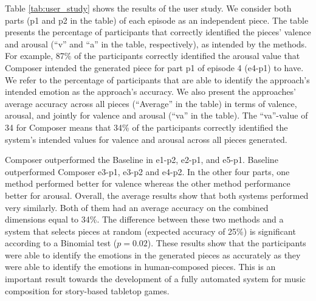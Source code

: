 Table \ref{tab:user_study} shows the results of the user study.
We consider both parts (p1 and p2 in the table) of each episode as an independent piece.
The table presents the percentage of participants that correctly identified the pieces' valence and arousal (``v'' and ``a'' in the table, respectively), as intended by the methods.
For example, 87\% of the participants correctly identified the arousal value that Composer intended the generated piece for part p1 of episode 4 (e4-p1) to have. We refer to the percentage of participants that are able to identify the approach's intended emotion as the approach's accuracy.
We also present the approaches' average accuracy across all pieces (``Average'' in the table) %
in terms of valence, arousal, and jointly for valence and arousal (``va'' in the table). The ``va''-value of 34 for Composer means that 34\% of the participants correctly identified the system's intended values for valence and arousal across all pieces generated. %


Composer outperformed the Baseline in e1-p2, e2-p1, and e5-p1. Baseline outperformed
Composer e3-p1, e3-p2 and e4-p2. In the other four parts,
one method performed better for valence whereas
the other method performance better for arousal.
Overall, the average results show that both systems performed very
similarly. Both of them had an average accuracy on the combined
dimensions equal to 34\%. The difference between these two methods and a
system that selects pieces at random (expected accuracy of 25\%)
is significant according to a Binomial test ($p = 0.02$).
These results show that the  participants  were  able  to  identify  the  emotions  in  the generated pieces as accurately as they were able to identify the emotions in human-composed pieces. This is an important
result towards the development of a fully automated system for music composition for story-based tabletop games.

